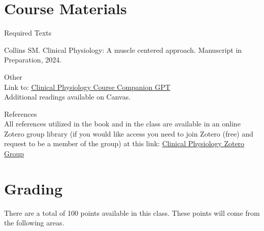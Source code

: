 \documentclass[letterpaper]{inzane_syllabus} %
\begin{document}
\section{Course Materials}
\vspace{0.2cm}

{\color{myCOLOR} Required Texts}
\vspace{0.2cm}

Collins SM. Clinical Physiology: A muscle centered approach. Manuscript in Preparation, 2024. 

{\color{myCOLOR} Other}\\
Link to: \href{https://chatgpt.com/g/g-67e58f208c708191b17bc5fb184fae1d-clinical-physiology-course-companion}{Clinical Physiology Course Companion GPT}  \\ 
Additional readings available on Canvas. 

{\color{myCOLOR} References}\\
All references utilized in the book and in the class are available in an online Zotero group library (if you would like access you need to join Zotero (free) and request to be a member of the group) at this link: \href{https://www.zotero.org/groups/4709608/clinical_phys_muscle}{Clinical Physiology Zotero Group}  



\newpage %

\makeFullPage

\vspace{0.5cm}
\section{Grading}
\vspace{0.5cm}

There are a total of 100 points available in this class. These points will come from the following areas.

\begin{twentyshort}
\end{twentyshort}
\end{document}
